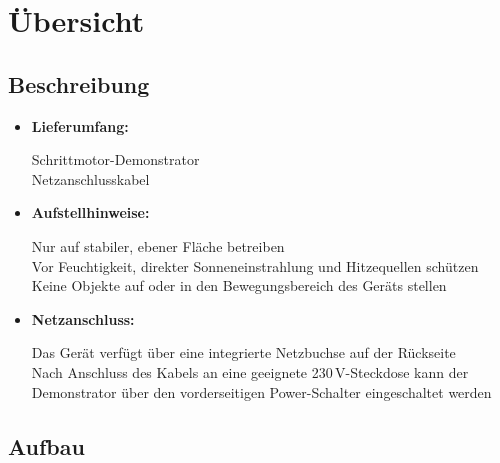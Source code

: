 \documentclass[a4paper,12pt]{report}
\begin{document}
	\chapter{Übersicht}
	\section{Beschreibung}
	\begin{itemize}[leftmargin=1.5em]
		Der Demonstrator veranschaulicht die typischen Bewegungsabläufe eines Schrittmotors anhand eines Linearschlittens. Dieser bewegt sich auf einer Linearführung und wird über einen Trapezgewindespindel (Leitspindel) mit einem NEMA17-Schrittmotor angetrieben. Der Antrieb erfolgt dabei in fünf verschiedenen Geschwindigkeitsstufen, die mithilfe eines Drehencoders auswählbar sind. Die ausgewählte Stufe wird über ein OLED-Display angezeigt, die Systemzustände über eine farbige Status-LED signalisiert. Das Gerät ist so konzipiert, dass es sich einfach auf einer stabilen, ebenen Fläche betreiben lässt.\\  
		
		\item \textbf{Lieferumfang:} 
		
		Schrittmotor-Demonstrator\\
		
		Netzanschlusskabel\\
		
		\item \textbf{Aufstellhinweise:} 
		
		Nur auf stabiler, ebener Fläche betreiben\\
		Vor Feuchtigkeit, direkter Sonneneinstrahlung und Hitzequellen schützen\\
		
		Keine Objekte auf oder in den Bewegungsbereich des Geräts stellen\\
		
		\item \textbf{Netzanschluss:}  
		
		Das Gerät verfügt über eine integrierte Netzbuchse auf der Rückseite\\
		
		Nach Anschluss des Kabels an eine geeignete 230 V-Steckdose kann der Demonstrator über den vorderseitigen Power-Schalter eingeschaltet werden\\
		
	\end{itemize}
	\section {Aufbau}
\end{document}
